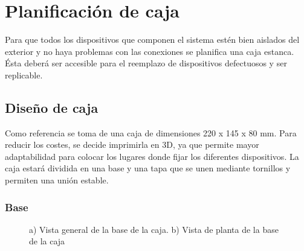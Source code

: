 \chapter{Planificación de caja}\label{chp-04}

Para que todos los dispositivos que componen el sistema estén bien aislados del exterior
y no haya problemas con las conexiones se planifica una caja estanca. Ésta deberá ser 
accesible para el reemplazo de dispositivos defectuosos y ser replicable. 

\section{Diseño de caja}

Como referencia se toma de una caja de dimensiones 220 x 145 x 80 mm. Para reducir los 
costes, se decide imprimirla en 3D, ya que permite mayor adaptabilidad para colocar 
los lugares donde fijar los diferentes dispositivos. La caja estará dividida en una base y una 
tapa que se unen mediante tornillos y permiten una unión estable.

\subsection{Base}



\begin{figure}[htpb]%
    \centering 
    \hspace{10pt}%
    \caption{a) Vista general de la base de la caja. b) Vista de planta de la base de la caja}
    \label{fig:cajabase} 
\end{figure} 

